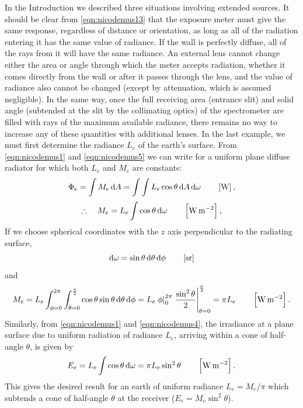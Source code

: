 \begin{refsection}
In the Introduction we described three situations involving extended sources.
It should be clear from \cref{eqn:nicodemus13} that the exposure meter must
give the same response, regardless of distance or orientation, as long as all
of the radiation entering it has the same value of radiance. If the wall
is perfectly diffuse, all of the rays from it will have the same radiance.
An external lens cannot change either the area or angle through which the
meter accepts radiation, whether it comes directly from the wall or after it
passes through the lens, and the value of radiance also cannot be changed
(except by attenuation, which is assumed negligible). In the same way, once
the full receiving area (entrance slit) and solid angle (subtended at the
slit by the collimating optics) of the spectrometer are filled with rays of
the maximum available radiance, there remains no way to increase any of these
quantities with additional lenses. In the last example, we must first determine
the radiance $L_e$ of the earth’s surface.
From \cref{eqn:nicodemus1} and \cref{eqn:nicodemus5} we can write
for a uniform plane diffuse radiator for which both $L_e$ and $M_e$ are constants:
\begin{equation*}
\Phi_e = \int M_e \d A = \int \int L_e \cos\theta \d A \d \omega
\qquad \left[\unit{\watt}\right],
\end{equation*}
\begin{equation}
\therefore\quad M_e = L_e \int \cos\theta \d \omega
\qquad \left[\unit{\watt\per\square\meter}\right],
\end{equation}
If we choose spherical coordinates with the $z$ axis perpendicular to the
radiating surface,
\begin{equation*}
\d \omega = \sin\theta\d\theta \d \phi
\qquad \left[\unit{\steradian}\right]
\end{equation*}
and
\begin{equation}
M_e = L_e \int_{\phi = 0}^{2\pi} \int_{\theta=0}^{\frac{\pi}{2}}\cos\theta
\sin\theta\d\theta \d\phi
= L_e \left.\phi\right|_{0}^{2\pi} \left.\frac{\sin^2\theta}{2}\right|_{\theta=0}^{\frac{\pi}{2}} = \pi L_e
\qquad \left[\unit{\watt\per\square\meter}\right].
\end{equation}
Similarly, from \cref{eqn:nicodemus1} and \cref{eqn:nicodemus4},
the irradiance at a plane surface due to uniform radiation of radiance $L_e$,
arriving within a cone of half-angle $\theta$, is given by
\begin{equation}
E_e = L_e \int \cos\theta \d\omega = \pi L_e \sin^2\theta
\qquad \left[\unit{\watt\per\square\meter}\right].
\end{equation}
This gives the desired result for an earth of uniform radiance
$L_e = M_e / \pi$ which subtends a cone of half-angle $\theta$ at the
receiver ($E_e = M_e \sin^2\theta$).


\end{refsection}
